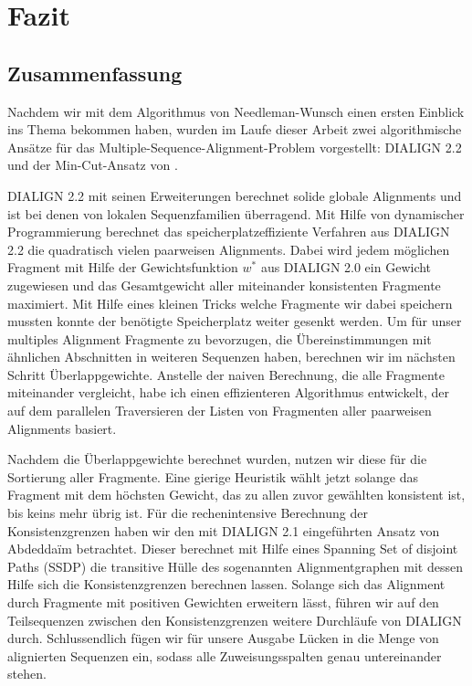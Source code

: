 \chapter{Fazit}
\label{ch:fazit}

\section{Zusammenfassung}

Nachdem wir mit dem Algorithmus von Needleman-Wunsch einen ersten Einblick ins Thema bekommen haben, wurden im Laufe dieser Arbeit zwei algorithmische Ansätze für das Multiple-Sequence-Alignment-Problem vorgestellt: DIALIGN 2.2 und der Min-Cut-Ansatz von \cite{cpm10}.

DIALIGN 2.2 mit seinen Erweiterungen berechnet solide globale Alignments und ist bei denen von lokalen Sequenzfamilien überragend. Mit Hilfe von dynamischer Programmierung berechnet das speicherplatzeffiziente Verfahren aus DIALIGN 2.2 die quadratisch vielen paarweisen Alignments. Dabei wird jedem möglichen Fragment mit Hilfe der Gewichtsfunktion $w^{*}$ aus DIALIGN 2.0 ein Gewicht zugewiesen und das Gesamtgewicht aller miteinander konsistenten Fragmente maximiert. Mit Hilfe eines kleinen Tricks welche Fragmente wir dabei speichern mussten konnte der benötigte Speicherplatz weiter gesenkt werden. Um für unser multiples Alignment Fragmente zu bevorzugen, die Übereinstimmungen mit ähnlichen Abschnitten in weiteren Sequenzen haben, berechnen wir im nächsten Schritt Überlappgewichte. Anstelle der naiven Berechnung, die alle Fragmente miteinander vergleicht, habe ich einen effizienteren Algorithmus entwickelt, der auf dem parallelen Traversieren der Listen von Fragmenten aller paarweisen Alignments basiert.

Nachdem die Überlappgewichte berechnet wurden, nutzen wir diese für die Sortierung aller Fragmente. Eine gierige Heuristik wählt jetzt solange das Fragment mit dem höchsten Gewicht, das zu allen zuvor gewählten konsistent ist, bis keins mehr übrig ist. Für die rechenintensive Berechnung der Konsistenzgrenzen haben wir den mit DIALIGN 2.1 eingeführten Ansatz von Abdedda\"im betrachtet. Dieser berechnet mit Hilfe eines Spanning Set of disjoint Paths (SSDP) die transitive Hülle des sogenannten Alignmentgraphen mit dessen Hilfe sich die Konsistenzgrenzen berechnen lassen.
Solange sich das Alignment durch Fragmente mit positiven Gewichten erweitern lässt, führen wir auf den Teilsequenzen zwischen den Konsistenzgrenzen weitere Durchläufe von DIALIGN durch. Schlussendlich fügen wir für unsere Ausgabe Lücken in die Menge von alignierten Sequenzen ein, sodass alle Zuweisungsspalten genau untereinander stehen.
	

